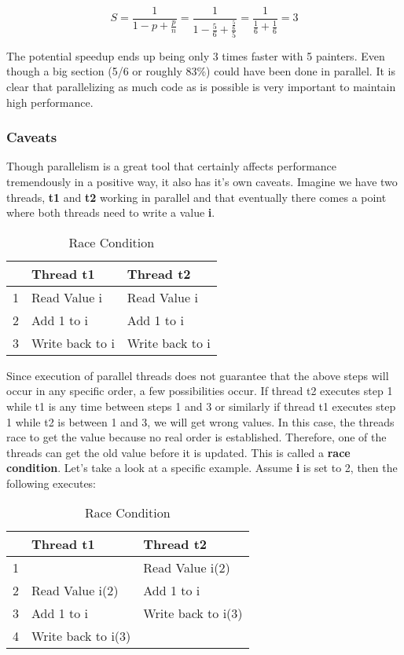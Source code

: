 \documentclass[letterpaper, 12pt]{article}
\begin{document}
\begin{equation}
	S = \frac{1}{1-p+\frac{p}{n}} = \frac{1}{1-\frac{5}{6}+\frac{\frac{5}{6}}{5}} = \frac{1}{\frac{1}{6}+\frac{1}{6}} = 3
\end{equation}

The potential speedup ends up being only 3 times faster with 5 painters. Even though a big section
(5/6 or roughly 83\%) could have been done in parallel. It is clear that parallelizing as much
code as is possible is very important to maintain high performance.

\subsubsection{Caveats}

Though parallelism is a great tool that certainly affects performance tremendously in a positive way,
it also has it's own caveats. Imagine we have two threads, {\bfseries t1} and {\bfseries t2}
working in parallel and that eventually there comes a point where both threads need to write a value {\bfseries i}.


\begin{table}[h]
\centering
\caption{Race Condition}
\begin{tabular}{|l|l|l|}
	\hline
	& {\bfseries Thread t1} & {\bfseries Thread t2} \\
	\hline
	1 & Read Value i & Read Value i \\
	\hline
	2 & Add 1 to i & Add 1 to i \\
	\hline
	3 & Write back to i & Write back to i \\
	\hline
\end{tabular}
\end{table}

Since execution of parallel threads does not guarantee that the above steps will occur in
any specific order, a few possibilities occur. If thread t2 executes step 1 while
t1 is any time between steps 1 and 3 or similarly if thread t1 executes step 1 while
t2 is between 1 and 3, we will get wrong values. In this case, the threads race
to get the value because no real order is established. Therefore, one of the
threads can get the old value before it is updated. This is called a {\bfseries race condition}.
Let's take a look at a specific example. Assume {\bfseries i} is set to 2,
then the following executes:

\begin{table}[h]
\centering
\caption{Race Condition}
\begin{tabular}{|l|l|l|}
	\hline
	& {\bfseries Thread t1} & {\bfseries Thread t2} \\
	\hline
	1 &  & Read Value i(2) \\
	\hline
	2 & Read Value i(2) & Add 1 to i \\
	\hline
	3 & Add 1 to i & Write back to i(3) \\
	\hline
	4 & Write back to i(3) &  \\
	\hline
\end{tabular}
\end{table}
\end{document}
